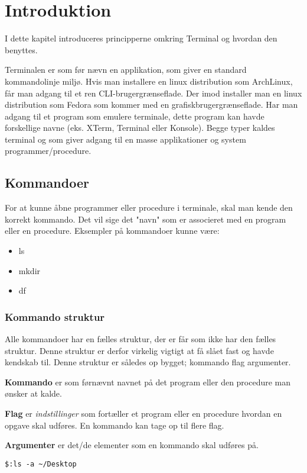 \chapter{Introduktion}
I dette kapitel introduceres principperne omkring Terminal og hvordan den benyttes. \par
Terminalen er som før nævn en applikation, som giver en standard kommandolinje miljø. Hvis man installere en linux distribution som ArchLinux, får man adgang til et ren CLI-brugergrænseflade. Der imod installer man en linux distribution som Fedora som kommer med en grafiskbrugergrænseflade. Har man adgang til et program som emulere terminale, dette
program kan havde forskellige navne (eks. XTerm, Terminal eller Konsole). Begge typer kaldes terminal og som giver adgang til en masse applikationer og system programmer/procedure.
\section{Kommandoer}
For at kunne åbne programmer eller procedure i terminale, skal man kende den korrekt kommando. Det vil sige det "navn" som er associeret med en program eller en procedure. 
Eksempler på kommandoer kunne være:
\begin{itemize}
	\item ls
	\item mkdir
	\item df
\end{itemize}
\subsection*{Kommando struktur}
Alle kommandoer har en fælles struktur, der er får som ikke har den fælles struktur.
Denne struktur er derfor virkelig vigtigt at få slået fast og havde kendskab til. Denne struktur er således op bygget; kommando flag argumenter.\par
\textbf{Kommando} er som førnævnt navnet på det program eller den procedure man ønsker at kalde. \par
\textbf{Flag} er \textit{indstillinger} som fortæller et program eller en procedure hvordan en opgave skal udføres. En kommando kan tage op til flere flag.\par
\textbf{Argumenter} er det/de elementer som en kommando skal udføres på.
\begin{lstlisting}[title=kommando eksempel]
	$:ls -a ~/Desktop 
\end{lstlisting}


